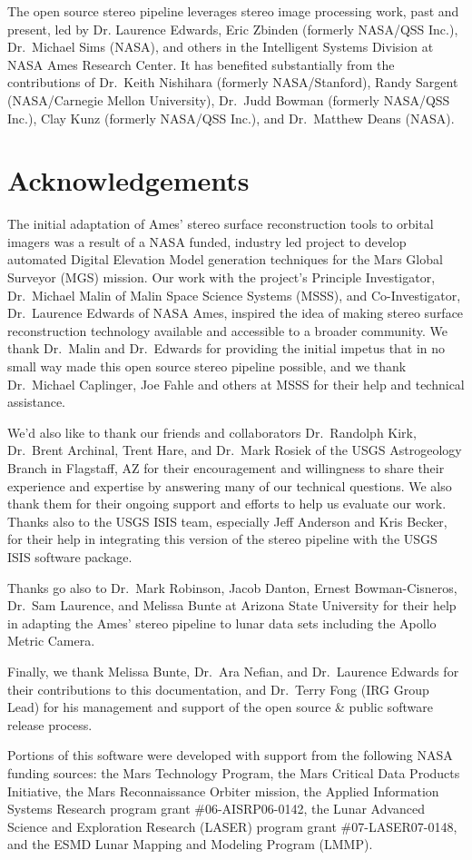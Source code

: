 The open source stereo pipeline leverages stereo image processing
work, past and present, led by Dr. Laurence Edwards, Eric Zbinden
(formerly NASA/QSS Inc.), Dr.~Michael Sims (NASA), and others in the
Intelligent Systems Division at NASA Ames Research Center. It has
benefited substantially from the contributions of Dr.~Keith Nishihara
(formerly NASA/Stanford), Randy Sargent (NASA/Carnegie Mellon
University), Dr.~Judd Bowman (formerly NASA/QSS Inc.), Clay Kunz
(formerly NASA/QSS Inc.), and Dr.~Matthew Deans (NASA).

\section*{Acknowledgements}

The initial adaptation of Ames' stereo surface reconstruction tools to
orbital imagers was a result of a NASA funded, industry led project to
develop automated Digital Elevation Model generation techniques for
the Mars Global Surveyor (MGS) mission. Our work with the project's
Principle Investigator, Dr.~Michael Malin of Malin Space Science
Systems (MSSS), and Co-Investigator, Dr.~Laurence Edwards of NASA
Ames, inspired the idea of making stereo surface reconstruction
technology available and accessible to a broader community.  We thank
Dr.~Malin and Dr.~Edwards for providing the initial impetus that in no
small way made this open source stereo pipeline possible, and we thank
Dr.~Michael Caplinger, Joe Fahle and others at MSSS for their help and
technical assistance.

We'd also like to thank our friends and collaborators Dr.~Randolph
Kirk, Dr.~Brent Archinal, Trent Hare, and Dr.~Mark Rosiek of the USGS
Astrogeology Branch in Flagstaff, AZ for their encouragement and
willingness to share their experience and expertise by answering many
of our technical questions.  We also thank them for their ongoing
support and efforts to help us evaluate our work.  Thanks also to the
USGS ISIS team, especially Jeff Anderson and Kris Becker, for their
help in integrating this version of the stereo pipeline with the USGS
ISIS software package.

Thanks go also to Dr.~Mark Robinson, Jacob Danton, Ernest
Bowman-Cisneros, Dr.~Sam Laurence, and Melissa Bunte at Arizona State
University for their help in adapting the Ames' stereo pipeline to
lunar data sets including the Apollo Metric Camera.

Finally, we thank Melissa Bunte, Dr.~Ara Nefian, and Dr.~Laurence
Edwards for their contributions to this documentation, and Dr.~Terry
Fong (IRG Group Lead) for his management and support of the open
source \& public software release process.

Portions of this software were developed with support from the
following NASA funding sources: the Mars Technology Program, the Mars
Critical Data Products Initiative, the Mars Reconnaissance Orbiter
mission, the Applied Information Systems Research program grant
\#06-AISRP06-0142, the Lunar Advanced Science and Exploration Research
(LASER) program grant \#07-LASER07-0148, and the ESMD Lunar Mapping and
Modeling Program (LMMP).
